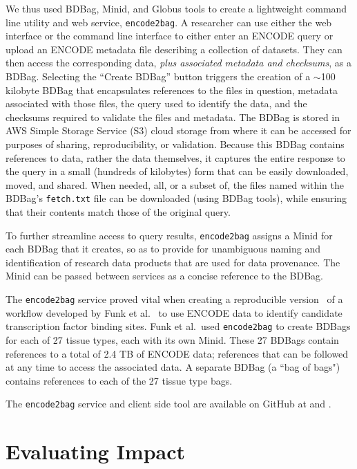\documentclass[11pt]{article}
\begin{document}
We thus used BDBag, Minid, and Globus tools to create a lightweight command line utility and web service, \texttt{encode2bag}.
A researcher can use either the web interface or the command line interface to
either enter an ENCODE query or upload an ENCODE metadata file describing a collection of datasets.
They can then access the corresponding data, \emph{plus associated metadata and checksums}, as a BDBag.
Selecting the ``Create BDBag'' button triggers the creation of a $\sim$100 kilobyte BDBag that encapsulates references to the files in question, metadata associated with those files, the query used to identify the data, and the checksums required to validate the files and metadata.
The BDBag is stored in AWS Simple Storage Service (S3) cloud storage from where it can be accessed for purposes of sharing, reproducibility, or validation.
Because this BDBag contains references to data, rather the data themselves, it captures the entire response to the query in a small (hundreds of kilobytes) form that can be easily downloaded, moved, and shared.
When needed, all, or a subset of, the files named within the BDBag's \texttt{fetch.txt} file can be downloaded
(using BDBag tools), while ensuring that their contents match those of the original query.

To further streamline access to query results, \texttt{encode2bag} assigns a Minid for each BDBag that it creates,
so as to provide for unambiguous naming and identification of research data products that are used for data provenance.
The Minid can be passed between services as a concise reference to the BDBag.

The \texttt{encode2bag} service proved vital when creating a reproducible version~\cite{madduri2018reproducible}
of a workflow developed by Funk et al.~\cite{funk18} to use ENCODE data to identify candidate
transcription factor binding sites. 
Funk et al.\ used
 \texttt{encode2bag} to create BDBags for each of 27 tissue types, each with its own Minid.
These 27 BDBags contain references to a total of 2.4 TB of ENCODE data;
references that can be followed at any time to access the associated data.
A separate BDBag (a ``bag of bags") contains references to each of the 27 tissue type bags. 

The \texttt{encode2bag} service and client side tool are available on GitHub at
 and 
.



\section{Evaluating Impact}
\end{document}
